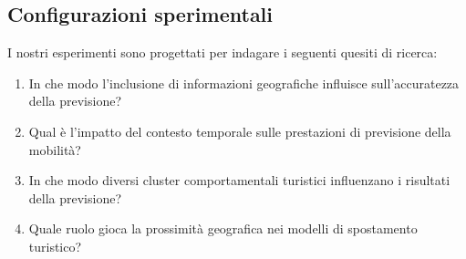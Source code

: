 \subsection{Configurazioni sperimentali}

I nostri esperimenti sono progettati per indagare i seguenti quesiti di ricerca:

\begin{enumerate}
\item In che modo l'inclusione di informazioni geografiche influisce sull'accuratezza della previsione?
\item Qual è l'impatto del contesto temporale sulle prestazioni di previsione della mobilità?
\item In che modo diversi cluster comportamentali turistici influenzano i risultati della previsione? \item Quale ruolo gioca la prossimità geografica nei modelli di spostamento turistico?
\end{enumerate}

